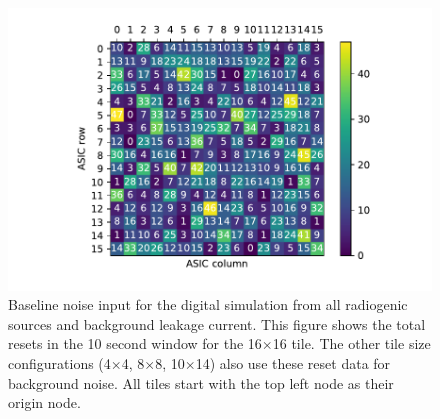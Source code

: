 \begin{figure}[]
\centering
\includegraphics[width=\textwidth]{images/localHitsRadiogenic.pdf}
\caption{Baseline noise input for the digital simulation from all radiogenic sources and background leakage current. 
This figure shows the total resets in the 10 second window for the 16$\times$16 tile.
The other tile size configurations (4$\times$4, 8$\times$8, 10$\times$14) also use these reset data for background noise.
All tiles start with the top left node as their origin node.
}
\end{figure}~\label{fig:reference_input_noise}

